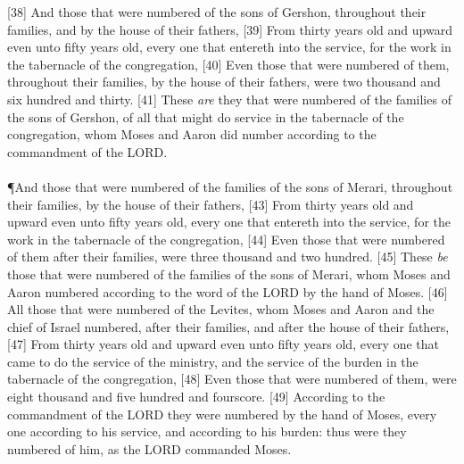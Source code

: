 [38] \textcolor[cmyk]{0.99998,1,0,0}{And those that were numbered of the sons of Gershon, throughout their families, and by the house of their fathers,}
[39] \textcolor[cmyk]{0.99998,1,0,0}{From thirty years old and upward even unto fifty years old, every one that entereth into the service, for the work in the tabernacle of the congregation,}
[40] \textcolor[cmyk]{0.99998,1,0,0}{Even those that were numbered of them, throughout their families, by the house of their fathers, were two thousand and six hundred and thirty.}
[41] \textcolor[cmyk]{0.99998,1,0,0}{These \emph{are} they that were numbered of the families of the sons of Gershon, of all that might do service in the tabernacle of the congregation, whom Moses and Aaron did number according to the commandment of the LORD.}\\
\\
\P\textcolor[cmyk]{0.99998,1,0,0}{And those that were numbered of the families of the sons of Merari, throughout their families, by the house of their fathers,}
[43] \textcolor[cmyk]{0.99998,1,0,0}{From thirty years old and upward even unto fifty years old, every one that entereth into the service, for the work in the tabernacle of the congregation,}
[44] \textcolor[cmyk]{0.99998,1,0,0}{Even those that were numbered of them after their families, were three thousand and two hundred.}
[45] \textcolor[cmyk]{0.99998,1,0,0}{These \emph{be} those that were numbered of the families of the sons of Merari, whom Moses and Aaron numbered according to the word of the LORD by the hand of Moses.}
[46] \textcolor[cmyk]{0.99998,1,0,0}{All those that were numbered of the Levites, whom Moses and Aaron and the chief of Israel numbered, after their families, and after the house of their fathers,}
[47] \textcolor[cmyk]{0.99998,1,0,0}{From thirty years old and upward even unto fifty years old, every one that came to do the service of the ministry, and the service of the burden in the tabernacle of the congregation,}
[48] \textcolor[cmyk]{0.99998,1,0,0}{Even those that were numbered of them, were eight thousand and five hundred and fourscore.}
[49] \textcolor[cmyk]{0.99998,1,0,0}{According to the commandment of the LORD they were numbered by the hand of Moses, every one according to his service, and according to his burden: thus were they numbered of him, as the LORD commanded Moses.}